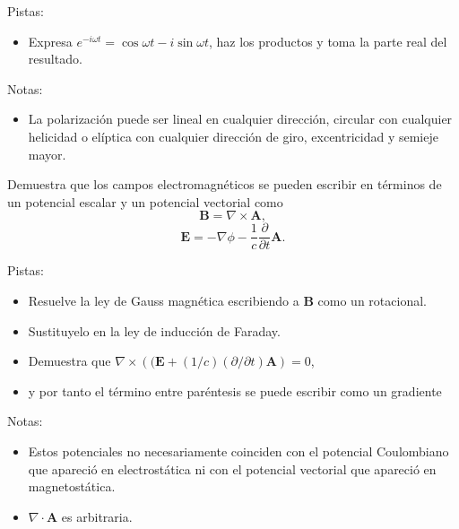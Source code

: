\documentclass{exam}
\begin{document}
\begin{questions}

  Pistas:
  \begin{itemize}
  \item Expresa $e^{-i\omega t}=\cos\omega t-i\sin\omega t$, haz los
    productos y toma la parte real del resultado.
  \end{itemize}
  Notas:
  \begin{itemize}
  \item La polarización puede ser lineal en cualquier dirección,
    circular con cualquier helicidad o elíptica con cualquier
    dirección de giro, excentricidad y semieje mayor.
  \end{itemize}


\question\label{8} Demuestra que los campos electromagnéticos se pueden
  escribir en términos de un potencial escalar y un potencial
  vectorial como
  $$
  \bm B=\nabla\times \bm A,
  $$
  $$
  \bm E=-\nabla\phi-\frac{1}{c}\frac{\partial}{\partial t}\bm A.
  $$

  Pistas:
  \begin{itemize}
  \item Resuelve la ley de Gauss magnética escribiendo a $\bm B$ como
    un rotacional.
  \item Sustituyelo en la ley de inducción de Faraday.
  \item Demuestra que $\nabla\times\left((\bm E+(1/c)(\partial/\partial
    t)\bm A\right)=0$,
  \item y por tanto el término entre paréntesis se puede escribir como
    un gradiente
  \end{itemize}

  Notas:
  \begin{itemize}
  \item Estos potenciales no necesariamente coinciden con el potencial
    Coulombiano que apareció en electrostática ni con el potencial
    vectorial que apareció en magnetostática.
  \item $\nabla\cdot\bm A$ es arbitraria.
  \end{itemize}



\end{questions}
\end{document}
